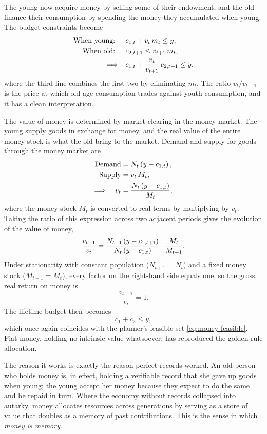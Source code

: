 The young now acquire money by selling some of their endowment, and the old finance their consumption by spending the money they accumulated when young. The budget constraints become
\[
\begin{aligned}
\text{When young: }\quad & c_{1,t} + v_t\, m_t \le y,\\
\text{When old: }\quad & c_{2,t+1} \le v_{t+1}\, m_t,\\
\Longrightarrow\quad & c_{1,t} + \frac{v_t}{v_{t+1}}\, c_{2,t+1} \le y,
\end{aligned}
\]
where the third line combines the first two by eliminating $m_t$. The ratio $v_t / v_{t+1}$ is the price at which old-age consumption trades against youth consumption, and it has a clean interpretation.


The value of money is determined by market clearing in the money market. The young supply goods in exchange for money, and the real value of the entire money stock is what the old bring to the market. Demand and supply for goods through the money market are
\[
\begin{aligned}
\text{Demand} &= N_t\left(y - c_{1,t}\right),\\
\text{Supply} &= v_t\, M_t,\\
\Longrightarrow\quad v_t &= \frac{N_t\left(y - c_{1,t}\right)}{M_t},
\end{aligned}
\]
where the money stock $M_t$ is converted to real terms by multiplying by $v_t$. Taking the ratio of this expression across two adjacent periods gives the evolution of the value of money,
\begin{equation}
\frac{v_{t+1}}{v_t}
= \frac{N_{t+1}\left(y - c_{1,t+1}\right)}{N_t\left(y - c_{1,t}\right)}\cdot\frac{M_t}{M_{t+1}}.
\label{eq:money-vratio}
\end{equation}
Under stationarity with constant population ($N_{t+1} = N_t$) and a fixed money stock ($M_{t+1} = M_t$), every factor on the right-hand side equals one, so the gross real return on money is
\[
\frac{v_{t+1}}{v_t} = 1.
\]
The lifetime budget then becomes
\[
c_1 + c_2 \le y,
\]
which once again coincides with the planner's feasible set \eqref{eq:money-feasible}. Fiat money, holding no intrinsic value whatsoever, has reproduced the golden-rule allocation.

The reason it works is exactly the reason perfect records worked. An old person who holds money is, in effect, holding a verifiable record that she gave up goods when young; the young accept her money because they expect to do the same and be repaid in turn. Where the economy without records collapsed into autarky, money allocates resources across generations by serving as a store of value that doubles as a memory of past contributions. This is the sense in which \emph{money is memory}.

